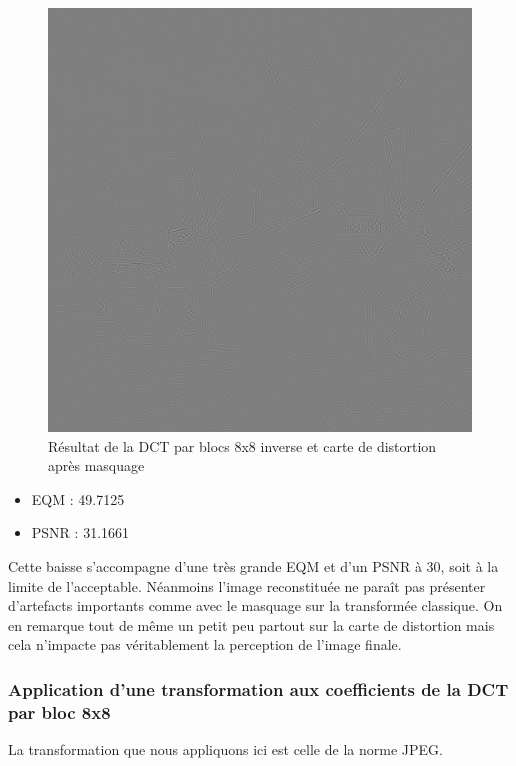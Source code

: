 \documentclass[12pt]{report}
\begin{document}
\begin{figure}[H]
\begin{center}
\includegraphics[scale=0.4]{../ImageRes/blockidct_masked_disto.jpg} 
\caption{Résultat de la DCT par blocs 8x8 inverse et carte de distortion après masquage}
\end{center}
\end{figure}

\begin{itemize}
\item EQM : 49.7125
\item PSNR : 31.1661\\
\end{itemize}

Cette baisse s'accompagne d'une très grande EQM et d'un PSNR à 30, soit à la limite de l'acceptable. Néanmoins l'image reconstituée ne paraît pas présenter d'artefacts importants comme avec le masquage sur la transformée classique. On en remarque tout de même un petit peu partout sur la carte de distortion mais cela n'impacte pas véritablement la perception de l'image finale.\\

\subsubsection{Application d'une transformation aux coefficients de la DCT par bloc 8x8}

La transformation que nous appliquons ici est celle de la norme JPEG.
\end{document}
